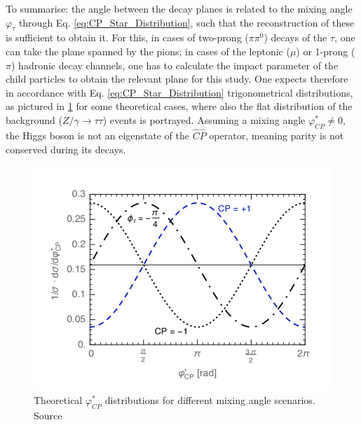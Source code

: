 To summarise: the angle between the decay planes is related to the mixing angle $\varphi_\tau$ through Eq. \ref{eq:CP_Star_Distribution}, such that the reconstruction of these is sufficient to obtain it. For this, in cases of two-prong ($\pi\pi^0$) decays of the $\tau$, one can take the plane spanned by the pions; in cases of the leptonic ($\mu$) or 1-prong ($\pi$) hadronic decay channels, one has to calculate the impact parameter of the child particles to obtain the relevant plane for this study. One expects therefore in accordance with Eq. \ref{eq:CP_Star_Distribution} trigonometrical distributions, as pictured in \ref{fig:phistardistribution} for some theoretical cases, where also the flat distribution of the background ($Z/\gamma \rightarrow \tau\tau$) events is portrayed. Assuming a mixing angle $\varphi_{CP}^* \neq 0$, the Higgs boson is not an eigenstate of the $\hat{C}\hat{P}$ operator, meaning parity is not conserved during its decays.
\begin{figure}[h]
	\centering
	\includegraphics[width=0.5\linewidth]{Figures/Phi_star_distribution}
	\caption{Theoretical $\varphi_{CP}^*$ distributions for different mixing angle scenarios. Source \parencite{Berge_CP_Prospects}}
	\label{fig:phistardistribution}
\end{figure}


